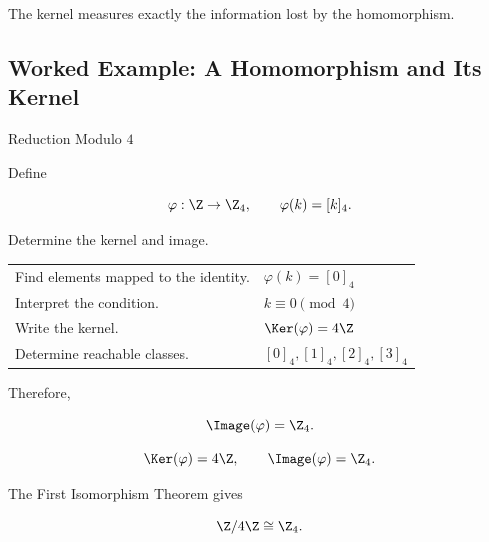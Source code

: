 \begin{center}
\end{center}

The kernel measures exactly the information lost by the homomorphism.

\subsection{Worked Example: A Homomorphism and Its Kernel}
\label{subsec:worked-group-homomorphism}

\begin{workedexamplebox}{Reduction Modulo \(4\)}

Define

\[ \varphi:\Z\to\Z_4,\qquad \varphi(k)=[k]_4. \]

Determine the kernel and image.

\begin{tabularx}{\textwidth}{@{}>{\raggedright\arraybackslash}p{}X@{}}
Find elements mapped to the identity. & \(\varphi(k)=[0]_4\)\\
Interpret the condition. & \(k\equiv0\pmod4\)\\
Write the kernel. & \(\Ker(\varphi)=4\Z\)\\
Determine reachable classes. & \([0]_4,[1]_4,[2]_4,[3]_4\)
\end{tabularx}

Therefore,

\[ \Image(\varphi)=\Z_4. \]

\begin{answerbox}
\[ \Ker(\varphi)=4\Z,\qquad\Image(\varphi)=\Z_4. \]
\end{answerbox}
\end{workedexamplebox}

The First Isomorphism Theorem gives

\[ \Z/4\Z\cong\Z_4. \]

